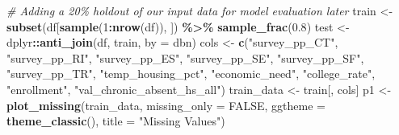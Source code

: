 \documentclass[
  man,floatsintext]{apa6}
\newenvironment{Shaded}{\begin{snugshade}}{\end{snugshade}}
\newcommand{\AttributeTok}[1]{\textcolor[rgb]{0.13,0.29,0.53}{#1}}
\newcommand{\CommentTok}[1]{\textcolor[rgb]{0.56,0.35,0.01}{\textit{#1}}}
\newcommand{\ConstantTok}[1]{\textcolor[rgb]{0.56,0.35,0.01}{#1}}
\newcommand{\DecValTok}[1]{\textcolor[rgb]{0.00,0.00,0.81}{#1}}
\newcommand{\FloatTok}[1]{\textcolor[rgb]{0.00,0.00,0.81}{#1}}
\newcommand{\FunctionTok}[1]{\textcolor[rgb]{0.13,0.29,0.53}{\textbf{#1}}}
\newcommand{\NormalTok}[1]{#1}
\newcommand{\OtherTok}[1]{\textcolor[rgb]{0.56,0.35,0.01}{#1}}
\newcommand{\SpecialCharTok}[1]{\textcolor[rgb]{0.81,0.36,0.00}{\textbf{#1}}}
\newcommand{\StringTok}[1]{\textcolor[rgb]{0.31,0.60,0.02}{#1}}
\begin{document}
\begin{Shaded}
\begin{Highlighting}[]
\CommentTok{\# Adding a 20\% holdout of our input data for model evaluation later}
\NormalTok{train }\OtherTok{\textless{}{-}} \FunctionTok{subset}\NormalTok{(df[}\FunctionTok{sample}\NormalTok{(}\DecValTok{1}\SpecialCharTok{:}\FunctionTok{nrow}\NormalTok{(df)), ]) }\SpecialCharTok{\%\textgreater{}\%} \FunctionTok{sample\_frac}\NormalTok{(}\FloatTok{0.8}\NormalTok{)}
\NormalTok{test  }\OtherTok{\textless{}{-}}\NormalTok{ dplyr}\SpecialCharTok{::}\FunctionTok{anti\_join}\NormalTok{(df, train, }\AttributeTok{by =} \StringTok{\textquotesingle{}dbn\textquotesingle{}}\NormalTok{)}
\NormalTok{cols }\OtherTok{\textless{}{-}} \FunctionTok{c}\NormalTok{(}\StringTok{"survey\_pp\_CT"}\NormalTok{, }\StringTok{"survey\_pp\_RI"}\NormalTok{,}
          \StringTok{"survey\_pp\_ES"}\NormalTok{, }\StringTok{"survey\_pp\_SE"}\NormalTok{,}
          \StringTok{"survey\_pp\_SF"}\NormalTok{, }\StringTok{"survey\_pp\_TR"}\NormalTok{,}
          \StringTok{"temp\_housing\_pct"}\NormalTok{, }\StringTok{"economic\_need"}\NormalTok{,}
          \StringTok{"college\_rate"}\NormalTok{, }\StringTok{"enrollment"}\NormalTok{,}
          \StringTok{"val\_chronic\_absent\_hs\_all"}\NormalTok{)}
\NormalTok{train\_data }\OtherTok{\textless{}{-}}\NormalTok{ train[, cols]}
\NormalTok{p1 }\OtherTok{\textless{}{-}} \FunctionTok{plot\_missing}\NormalTok{(train\_data, }\AttributeTok{missing\_only =} \ConstantTok{FALSE}\NormalTok{,}
                   \AttributeTok{ggtheme =} \FunctionTok{theme\_classic}\NormalTok{(), }\AttributeTok{title =} \StringTok{"Missing Values"}\NormalTok{)}


\end{Highlighting}
\end{Shaded}
\end{document}
